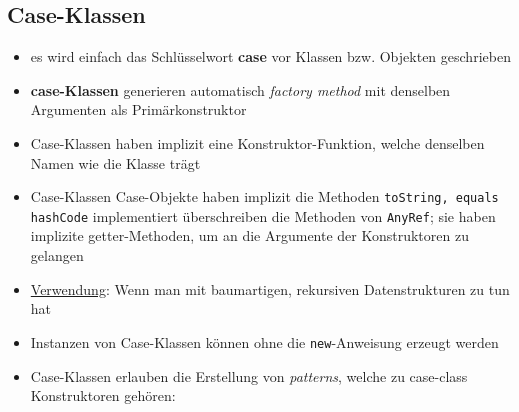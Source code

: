 \subsection{Case-Klassen}
\begin{itemize}
  \item es wird einfach das Schlüsselwort \textbf{case} vor Klassen bzw. 
  Objekten geschrieben
  \item \textbf{case-Klassen} generieren automatisch 
  \textit{factory method} mit denselben Argumenten als Primärkonstruktor
  \item Case-Klassen haben implizit eine Konstruktor-Funktion, 
  welche denselben Namen wie die Klasse trägt
  \item Case-Klassen \und Case-Objekte haben implizit die Methoden
  \texttt{toString, equals} \und \texttt{hashCode} implementiert \und 
  überschreiben die Methoden von \texttt{AnyRef}; sie haben implizite 
  getter-Methoden, um an die Argumente der Konstruktoren zu gelangen
  \item \uline{Verwendung}: Wenn man mit baumartigen, rekursiven
  Datenstrukturen zu tun hat
  \item Instanzen von Case-Klassen können ohne die \texttt{new}-Anweisung
  erzeugt werden
  
    
  
  \item Case-Klassen erlauben die Erstellung von \textit{patterns}, welche
  zu case-class Konstruktoren gehören:
  
  
  
\end{itemize}


